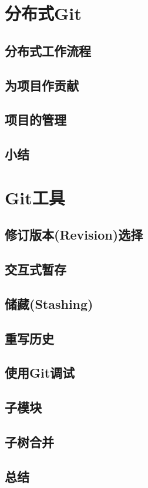 \documentclass{book}
\begin{document}
\chapter{分布式Git}
	\section{分布式工作流程}
	\section{为项目作贡献}
	\section{项目的管理}
	\section{小结}

\chapter{Git工具}
	\section{修订版本(Revision)选择}
	\section{交互式暂存}
	\section{储藏(Stashing)}
	\section{重写历史}
	\section{使用Git调试}
	\section{子模块}
	\section{子树合并}
	\section{总结}
\end{document}
